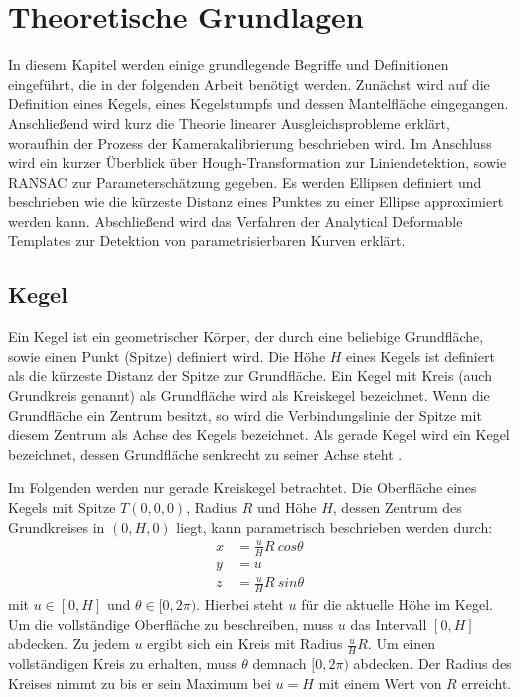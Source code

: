 \chapter{Theoretische Grundlagen}
\label{ch:theory}
In diesem Kapitel werden einige grundlegende Begriffe und Definitionen eingeführt, die in der folgenden Arbeit benötigt werden.
Zunächst wird auf die Definition eines Kegels, eines Kegelstumpfs und dessen Mantelfläche eingegangen.
Anschließend wird kurz die Theorie linearer Ausgleichsprobleme erklärt, woraufhin der Prozess der Kamerakalibrierung
beschrieben wird.
Im Anschluss wird ein kurzer Überblick über Hough-Transformation zur Liniendetektion, sowie RANSAC zur Parameterschätzung gegeben.
Es werden Ellipsen definiert und beschrieben wie die kürzeste Distanz eines Punktes zu einer Ellipse approximiert werden kann.
Abschließend wird das Verfahren der Analytical Deformable Templates zur Detektion von parametrisierbaren Kurven erklärt.

\section{Kegel}
\label{s:cone}

\begin{definition}[Kegel]
	Ein Kegel ist ein geometrischer Körper, der durch eine beliebige Grundfläche, sowie einen Punkt (Spitze) definiert wird.
	Die Höhe $H$ eines Kegels ist definiert als die kürzeste Distanz der Spitze zur Grundfläche.
	Ein Kegel mit Kreis (auch Grundkreis genannt) als Grundfläche wird als Kreiskegel bezeichnet.
	Wenn die Grundfläche ein Zentrum besitzt, so wird die Verbindungslinie der Spitze mit diesem Zentrum als Achse des Kegels bezeichnet.
	Als gerade Kegel wird ein Kegel bezeichnet, dessen Grundfläche senkrecht zu seiner Achse steht \cite{James1992}.
\end{definition}

Im Folgenden werden nur gerade Kreiskegel betrachtet. Die Oberfläche eines Kegels mit Spitze $T(0,0,0)$, Radius $R$ und Höhe $H$, dessen Zentrum des Grundkreises in $(0,H,0)$ liegt, kann parametrisch beschrieben werden durch:
\begin{equation} \label{eq:paramCone}
\begin{aligned}
x &= \frac{u}{H} R~cos \theta \\
y &= u \\
z &= \frac{u}{H} R~sin \theta
\end{aligned}
\end{equation} %
mit $u\in [0, H]$ und $\theta \in [0, 2\pi)$. Hierbei steht $u$ für die aktuelle Höhe im Kegel. Um die vollständige Oberfläche zu beschreiben, muss $u$ das Intervall $[0, H]$ abdecken. Zu jedem $u$ ergibt sich ein Kreis mit Radius $\frac{u}{H} R$. Um einen vollständigen Kreis zu erhalten, muss $\theta$ demnach $[0, 2\pi)$ abdecken. Der Radius des Kreises nimmt zu bis er sein Maximum bei $u = H$ mit einem Wert von $R$ erreicht.


